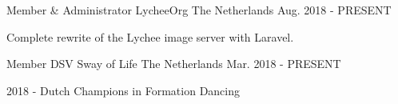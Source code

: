 
\begin{cventries}


  \cventry
    {Member \& Administrator} %
    {LycheeOrg} %
    {The Netherlands} %
    {Aug. 2018 - PRESENT} %
    {
      \begin{cvitems} %
        \item {Complete rewrite of the Lychee image server with Laravel.}
      \end{cvitems}
    }

  \cventry
    {Member} %
    {DSV Sway of Life} %
    {The Netherlands} %
    {Mar. 2018 - PRESENT} %
    {
      \begin{cvitems} %
        \item {2018 - Dutch Champions in Formation Dancing}
      \end{cvitems}
    }

\end{cventries}
